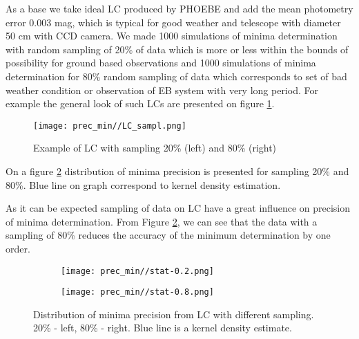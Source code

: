 As a base we take ideal LC produced by PHOEBE and add the mean photometry error 0.003 mag, which is typical for good weather and telescope with diameter 50 cm with CCD camera. 
We made 1000 simulations of minima determination with random sampling of 20\% of data which is more or less within the bounds of possibility for ground based observations and 1000 simulations of minima determination for 80\% random sampling of data which corresponds to set of bad weather condition or observation of EB system with very long period. 
For example the general look of such LCs are presented on figure \ref{fig:LC_sampl}.

\begin{figure}[!h]
    \centering
    \texttt{[image: prec\_min//LC\_sampl.png]}
    \caption{Example of LC with sampling 20\% (left) and 80\% (right)}
    \label{fig:LC_sampl}
\end{figure}


On a figure \ref{fig:sampl_diag} distribution of minima precision is presented for sampling 20\% and 80\%.
Blue line on graph correspond to kernel density estimation.

As it can be expected sampling of data on LC have a great influence on precision of minima determination. 
From Figure \ref{fig:sampl_diag}, we can see that the data with a sampling of 80\% reduces the accuracy of the minimum determination by one order.

\begin{figure}[!h]
    \centering
    \begin{subfigure}[t]{0.5\textwidth}
        \centering
        \texttt{[image: prec\_min//stat-0.2.png]}
    \end{subfigure}%
    \begin{subfigure}[t]{0.5\textwidth}
        \centering
        \texttt{[image: prec\_min//stat-0.8.png]}
    \end{subfigure}
    \caption{Distribution of minima precision from LC with different sampling. 20\% - left, 80\% - right. Blue line is a kernel density estimate.}
\label{fig:sampl_diag}
\end{figure}

